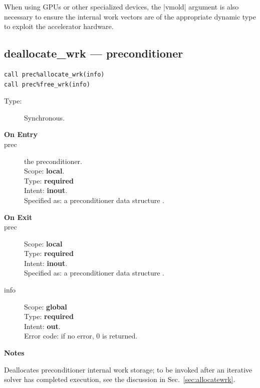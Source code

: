 When using GPUs or other specialized devices, the \fortinline|vmold|
argument is also necessary to ensure the internal work vectors are of
the appropriate dynamic type to exploit the accelerator hardware.


\clearpage\subsection{deallocate\_wrk --- preconditioner}

\begin{verbatim}
call prec%allocate_wrk(info)
call prec%free_wrk(info)
\end{verbatim}

\begin{description}
\item[Type:] Synchronous.
\item[\bf On Entry]
\item[prec] the preconditioner.\\
Scope: {\bf local}.\\
Type: {\bf required}\\
Intent: {\bf inout}.\\
Specified as: a preconditioner data structure \precdata.
\item[\bf On Exit]

\item[prec] 
Scope: {\bf local} \\
Type: {\bf required}\\
Intent: {\bf inout}.\\
Specified as: a preconditioner data structure \precdata.
\item[info] 
Scope: {\bf global} \\
Type: {\bf required}\\
Intent: {\bf out}.\\
Error code: if no error, 0 is returned.
\end{description}
{\par\noindent\large\bfseries Notes}
Deallocates preconditioner internal work storage; to be invoked after an
iterative solver has completed execution, see the discussion in
Sec.~\ref{sec:allocatewrk}. 



